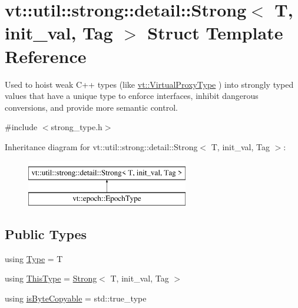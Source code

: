 \hypertarget{structvt_1_1util_1_1strong_1_1detail_1_1_strong}{}\section{vt\+:\+:util\+:\+:strong\+:\+:detail\+:\+:Strong$<$ T, init\+\_\+val, Tag $>$ Struct Template Reference}
\label{structvt_1_1util_1_1strong_1_1detail_1_1_strong}


Used to hoist weak C++ types (like {\ttfamily \hyperlink{namespacevt_a1b417dd5d684f045bb58a0ede70045ac}{vt\+::\+Virtual\+Proxy\+Type}} ) into strongly typed values that have a unique type to enforce interfaces, inhibit dangerous conversions, and provide more semantic control.  




{\ttfamily \#include $<$strong\+\_\+type.\+h$>$}

Inheritance diagram for vt\+:\+:util\+:\+:strong\+:\+:detail\+:\+:Strong$<$ T, init\+\_\+val, Tag $>$\+:\begin{figure}[H]
\begin{center}
\leavevmode
\includegraphics[height=2.000000cm]{structvt_1_1util_1_1strong_1_1detail_1_1_strong}
\end{center}
\end{figure}
\subsection*{Public Types}
\begin{DoxyCompactItemize}
\item 
using \hyperlink{structvt_1_1util_1_1strong_1_1detail_1_1_strong_ab47d63a1c618b3aafd0b30f022fedba7}{Type} = T
\item 
using \hyperlink{structvt_1_1util_1_1strong_1_1detail_1_1_strong_a510d40741bda362d97a4753919a577dd}{This\+Type} = \hyperlink{structvt_1_1util_1_1strong_1_1detail_1_1_strong}{Strong}$<$ T, init\+\_\+val, Tag $>$
\item 
using \hyperlink{structvt_1_1util_1_1strong_1_1detail_1_1_strong_add96444b837f77d0fc47ae3d29d00bdb}{is\+Byte\+Copyable} = std\+::true\+\_\+type
\end{DoxyCompactItemize}
